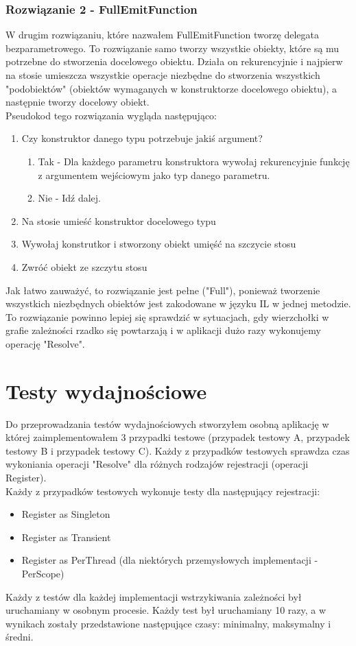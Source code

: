 \documentclass[12pt]{article}
\begin{document}
\subsubsection{Rozwiązanie 2 - FullEmitFunction}
W drugim rozwiązaniu, które nazwałem FullEmitFunction tworzę delegata bezparametrowego. To rozwiązanie samo tworzy  wszystkie obiekty, które są mu potrzebne do stworzenia docelowego obiektu. Działa on rekurencyjnie i najpierw na stosie umieszcza wszystkie operacje niezbędne do stworzenia wszystkich "podobiektów" (obiektów wymaganych w konstruktorze docelowego obiektu), a następnie tworzy docelowy obiekt.\\
Pseudokod tego rozwiązania wygląda następująco:
\begin{enumerate}
	\item Czy konstruktor danego typu potrzebuje jakiś argument?
	\begin{enumerate}
		\item Tak - Dla każdego parametru konstruktora wywołaj rekurencyjnie funkcję z argumentem wejściowym jako typ danego parametru.
		\item Nie - Idź dalej.
	\end{enumerate}
	\item Na stosie umieść konstruktor docelowego typu
	\item Wywołaj konstrutkor i stworzony obiekt umięść na szczycie stosu
	\item Zwróć obiekt ze szczytu stosu
\end{enumerate}
Jak łatwo zauważyć, to rozwiązanie jest pełne ("Full"), ponieważ tworzenie wszystkich niezbędnych obiektów jest zakodowane w języku IL w jednej metodzie.\\
To rozwiązanie powinno lepiej się sprawdzić w sytuacjach, gdy wierzchołki w grafie zależności rzadko się powtarzają i w aplikacji dużo razy wykonujemy operację "Resolve".



\clearpage

\section{Testy wydajnościowe}
Do przeprowadzania testów wydajnościowych stworzyłem osobną aplikację w której zaimplementowałem 3 przypadki testowe (przypadek testowy A, przypadek testowy B i przypadek testowy C). Każdy z przypadków testowych sprawdza czas wykoniania operacji "Resolve" dla różnych rodzajów rejestracji (operacji Register).\\
Każdy z przypadków testowych wykonuje testy dla następujący rejestracji:
\begin{itemize}
	\item Register as Singleton
	\item Register as Transient
	\item Register as PerThread (dla niektórych przemysłowych implementacji - PerScope)
\end{itemize}
Każdy z testów dla każdej implementacji wstrzykiwania zależności był uruchamiany w osobnym procesie. Każdy test był uruchamiany {\color{red}10} razy, a w wynikach zostały przedstawione następujące czasy: minimalny,  maksymalny i średni.
\end{document}
